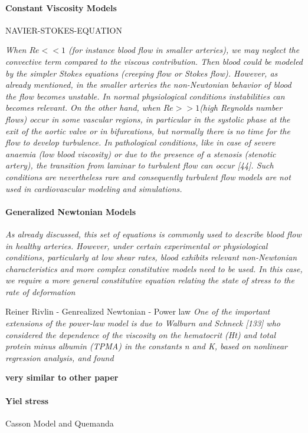 \documentclass[11pt,letterpaper]{article}
\begin{document}
\paragraph{Constant Viscosity Models}
NAVIER-STOKES-EQUATION

\textit{When $Re << 1$ (for instance blood flow in smaller arteries), we may neglect the convective term compared to the viscous contribution. Then blood could be
modeled by the simpler Stokes equations (creeping flow or Stokes flow). However, as already mentioned, in the smaller arteries the non-Newtonian behavior of blood the flow becomes unstable. In normal physiological conditions instabilities can becomes relevant. On the other hand, when $Re >> 1$(high Reynolds number flows) occur in some vascular regions, in particular in the systolic phase at the exit of the aortic valve or in bifurcations, but normally there is no time for the flow to develop turbulence. In pathological conditions, like in case of severe anaemia (low blood viscosity) or due to the presence of a stenosis (stenotic artery), the transition from laminar to turbulent flow can occur [44]. Such conditions are nevertheless rare and consequently turbulent flow models are not used in cardiovascular modeling and simulations.}


\paragraph{Generalized Newtonian Models}
\textit{As already discussed, this set of equations is commonly used to describe blood flow in healthy arteries. However, under certain experimental or physiological conditions, particularly at low shear rates, blood exhibits relevant non-Newtonian characteristics and more complex constitutive models need to be used. In this case, we require a more general constitutive equation relating the state of stress to the rate of deformation}

Reiner Rivlin - Genrealized Newtonian - Power law
\textit{One of the important extensions of the power-law model is due to Walburn and
Schneck [133] who considered the dependence of the viscosity on the hematocrit (Ht) and total protein minus albumin (TPMA) in the constants n and K, based on nonlinear regression analysis, and found}


\textbf{very similar to other paper}

\paragraph{Yiel stress}
Casson Model and Quemanda
\end{document}
